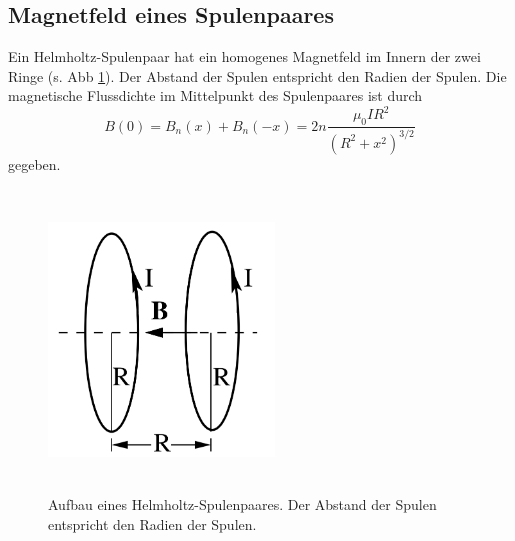 \subsection{Magnetfeld eines Spulenpaares}
Ein Helmholtz-Spulenpaar hat ein homogenes Magnetfeld im Innern der zwei Ringe %
(s. Abb \ref{fig:helmholtz}). Der Abstand der Spulen entspricht den Radien der
Spulen.
Die magnetische Flussdichte im Mittelpunkt des Spulenpaares ist durch 
\begin{equation}
    B(0)= B_{n}(x) + B_{n}(-x) = 2n \frac{\mu_{0} I R^2}{(R^2 + x^2)^{3/2}} %
    \label{eqn:spulenpaar}
\end{equation}
gegeben.
\begin{figure}
    \centering
    \includegraphics[width=6cm,height=8cm]{build/Helmholtz.png}
    \caption{Aufbau eines Helmholtz-Spulenpaares. Der Abstand der Spulen
    entspricht den Radien der Spulen.}
    \label{fig:helmholtz}
\end{figure}

